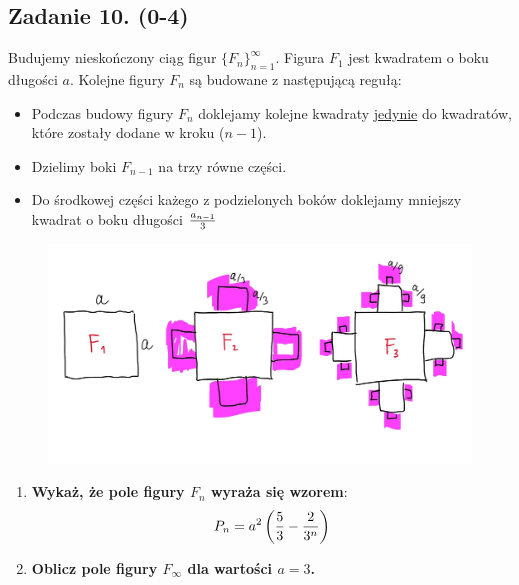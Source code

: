 \subsection*{Zadanie 10. (0-4)}
Budujemy nieskończony ciąg figur $\{F_n\}_{n=1}^\infty$.
Figura $F_1$ jest kwadratem o boku długości $a$.
Kolejne figury $F_n$ są budowane z następującą regułą:
\begin{itemize}
    \item Podczas budowy figury $F_{n}$ doklejamy kolejne kwadraty \underline{jedynie} do kwadratów, które zostały dodane w kroku ($n-1$). 
    \item Dzielimy boki $F_{n-1}$ na trzy równe części.
    \item Do środkowej części każego z podzielonych boków doklejamy mniejszy kwadrat o boku długości $a_{n-1}\over 3$
\end{itemize}

\begin{figure}[htbp]
    \centering
    \includegraphics[width=0.6\columnwidth]{figures/zad10.png}
    \label{fig:enter-label}
\end{figure}


\begin{enumerate}
    \item \textbf{Wykaż, że pole figury $F_n$ wyraża się wzorem}:
$$
P_n = a^2\left({5\over 3} - {2 \over {3^n}}\right)
$$
\item \textbf{Oblicz pole figury $F_\infty$ dla wartości $a=3$.}

\end{enumerate}
